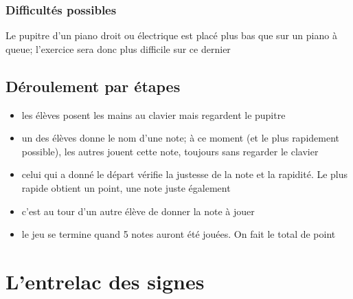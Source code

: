 \documentclass[a4paper,11pt,bibliography=totoc,numbers=noenddot,listof=flat,DIV=11,BCOR=0mm]{scrreprt}%
\begin{document}
\begin{itemize}
\subsection*{Difficultés possibles}
Le pupitre d'un piano droit ou électrique est placé plus bas que sur un piano à queue; l'exercice sera donc plus difficile sur ce dernier

\section*{Déroulement par étapes}
\begin{itemize}
\item les élèves posent les mains au clavier mais regardent le pupitre
\item un des élèves donne le nom d'une note; à ce moment (et le plus rapidement possible), les autres jouent cette note, toujours sans regarder le clavier
\item celui qui a donné le départ vérifie la justesse de la note et la rapidité. Le plus rapide obtient un point, une note juste également
\item c'est au tour d'un autre élève de donner la note à jouer
\item le jeu se termine quand 5 notes auront été jouées. On fait le total de point
\end{itemize}


%
%

\end{itemize}

\chapter[Soundpainting: L'entrelac des signes]{L'entrelac des signes}
\end{document}
